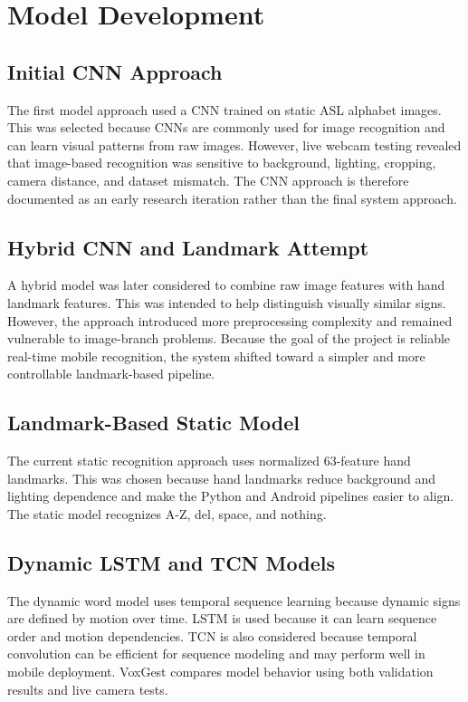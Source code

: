 \section{Model Development}

\subsection{Initial CNN Approach}

The first model approach used a CNN trained on static ASL alphabet images. This was selected because CNNs are commonly used for image recognition and can learn visual patterns from raw images. However, live webcam testing revealed that image-based recognition was sensitive to background, lighting, cropping, camera distance, and dataset mismatch. The CNN approach is therefore documented as an early research iteration rather than the final system approach.

\subsection{Hybrid CNN and Landmark Attempt}

A hybrid model was later considered to combine raw image features with hand landmark features. This was intended to help distinguish visually similar signs. However, the approach introduced more preprocessing complexity and remained vulnerable to image-branch problems. Because the goal of the project is reliable real-time mobile recognition, the system shifted toward a simpler and more controllable landmark-based pipeline.

\subsection{Landmark-Based Static Model}

The current static recognition approach uses normalized 63-feature hand landmarks. This was chosen because hand landmarks reduce background and lighting dependence and make the Python and Android pipelines easier to align. The static model recognizes A-Z, del, space, and nothing.

\subsection{Dynamic LSTM and TCN Models}

The dynamic word model uses temporal sequence learning because dynamic signs are defined by motion over time. LSTM is used because it can learn sequence order and motion dependencies. TCN is also considered because temporal convolution can be efficient for sequence modeling and may perform well in mobile deployment. VoxGest compares model behavior using both validation results and live camera tests.

